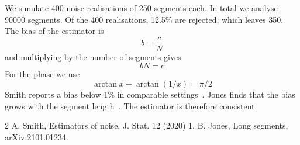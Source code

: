\documentclass{article}
\begin{document}
We simulate 400 noise realisations of 250 segments each.
In total we analyse 90000 segments.
Of the 400 realisations, 12.5\% are rejected, which leaves 350.
The bias of the estimator is
\begin{equation}
  b = \frac{c}{N} \label{eq:bias}
\end{equation}
and multiplying by the number of segments gives
\begin{equation}
  b N = c \label{eq:product}
\end{equation}
For the phase we use
\begin{equation}
  \arctan x + \arctan(1/x) = \pi/2 \label{eq:phase}
\end{equation}
Smith reports a bias below 1\% in comparable settings~\cite{smith2020}.
Jones finds that the bias grows with the segment length~\cite{jones2021}.
The estimator is therefore consistent.
\begin{thebibliography}{2}
 A. Smith, Estimators of noise, J. Stat. 12 (2020) 1.
 B. Jones, Long segments, arXiv:2101.01234.
\end{thebibliography}
\end{document}
